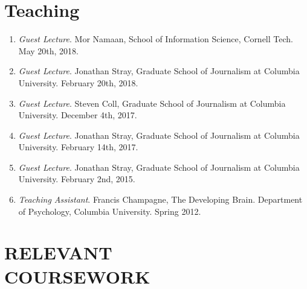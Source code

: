 \documentclass[margin]{res}
\newcommand{\fullhrulefill}{%
	\vspace{.7\baselineskip}
	\hspace*{-\sectionwidth}\hrulefill%
}
\begin{document}
\begin{resume}
\section{Teaching}
\begin{enumerate}
	\item \textit{Guest Lecture}. Mor Namaan, School of Information Science, Cornell Tech. May 20th, 2018.
	\item \textit{Guest Lecture}. Jonathan Stray, Graduate School of Journalism at Columbia University. February 20th, 2018.
	\item \textit{Guest Lecture}. Steven Coll, Graduate School of Journalism at Columbia University. December 4th, 2017. 
	\item \textit{Guest Lecture}. Jonathan Stray, Graduate School of Journalism at Columbia University. February 14th, 2017. 
	\item \textit{Guest Lecture}. Jonathan Stray, Graduate School of Journalism at Columbia University. February 2nd, 2015.
	\item \textit{Teaching Assistant}. Francis Champagne, The Developing Brain. Department of Psychology, Columbia University. Spring 2012.
\end{enumerate}

\section{RELEVANT\\COURSEWORK}
\vspace{\baselineskip}
\fullhrulefill

\end{resume}
\end{document}
